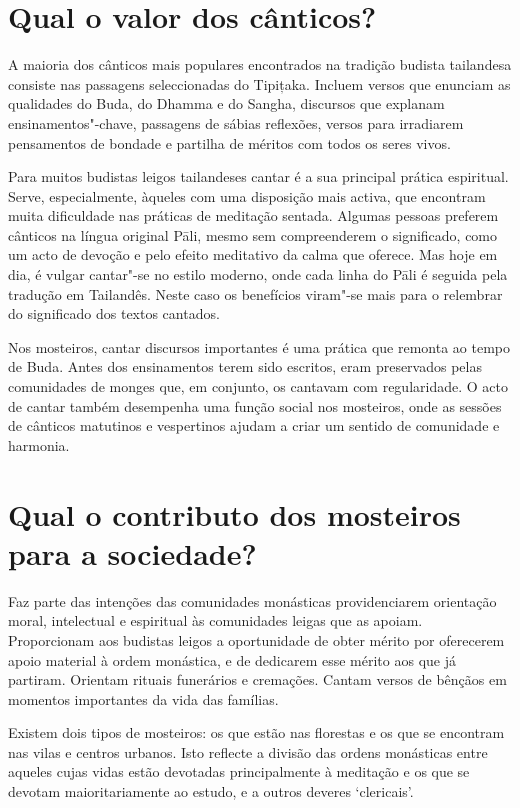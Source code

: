 \section{Qual o valor dos cânticos?}

A maioria dos cânticos mais populares encontrados na tradição budista
tailandesa consiste nas passagens seleccionadas do Tipițaka. Incluem
versos que enunciam as qualidades do Buda, do Dhamma e do Sangha,
discursos que explanam ensinamentos"-chave, passagens de sábias
reflexões, versos para irradiarem pensamentos de bondade e partilha
de méritos com todos os seres vivos.

Para muitos budistas leigos tailandeses cantar é a sua principal prática
espiritual. Serve, especialmente, àqueles com uma disposição mais
activa, que encontram muita dificuldade nas práticas de meditação
sentada. Algumas pessoas preferem cânticos na língua original Pāli,
mesmo sem compreenderem o significado, como um acto de devoção e pelo
efeito meditativo da calma que oferece. Mas hoje em dia, é vulgar
cantar"-se no estilo moderno, onde cada linha do Pāli é seguida pela
tradução em Tailandês. Neste caso os benefícios viram"-se mais para o
relembrar do significado dos textos cantados.

Nos mosteiros, cantar discursos importantes é uma prática que remonta ao
tempo de Buda. Antes dos ensinamentos terem sido escritos, eram
preservados pelas comunidades de monges que, em conjunto, os cantavam
com regularidade. O acto de cantar também desempenha uma função social
nos mosteiros, onde as sessões de cânticos matutinos e vespertinos
ajudam a criar um sentido de comunidade e harmonia.

\section{Qual o contributo dos mosteiros para a sociedade?}

Faz parte das intenções das comunidades monásticas providenciarem
orientação moral, intelectual e espiritual às comunidades leigas que as
apoiam. Proporcionam aos budistas leigos a oportunidade de obter mérito
por oferecerem apoio material à ordem monástica, e de dedicarem esse
mérito aos que já partiram. Orientam rituais funerários e
cremações. Cantam versos de bênçãos em momentos importantes da vida das
famílias.

Existem dois tipos de mosteiros: os que estão nas florestas e os que se
encontram nas vilas e centros urbanos. Isto reflecte a divisão das
ordens monásticas entre aqueles cujas vidas estão devotadas
principalmente à meditação e os que se devotam maioritariamente ao estudo,
e a outros deveres `clericais'.

